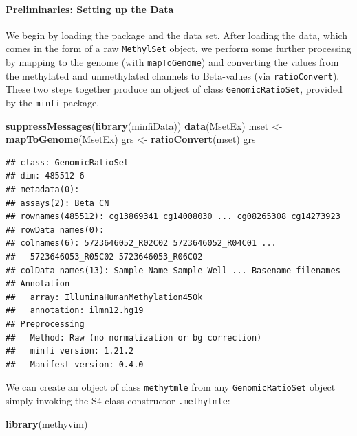 \documentclass[9pt,a4paper,]{extarticle}
\newenvironment{Shaded}{\begin{snugshade}}{\end{snugshade}}
\newcommand{\KeywordTok}[1]{\textcolor[rgb]{0.13,0.29,0.53}{\textbf{#1}}}
\newcommand{\NormalTok}[1]{#1}
\newcommand{\StringTok}[1]{\textcolor[rgb]{0.31,0.60,0.02}{#1}}
\theoremstyle{definition}
\theoremstyle{definition}
\theoremstyle{definition}
\theoremstyle{remark}
\begin{document}
\hypertarget{preliminaries-setting-up-the-data}{%
\paragraph{Preliminaries: Setting up the Data}\label{preliminaries-setting-up-the-data}}

We begin by loading the package and the data set. After loading the data, which
comes in the form of a raw \texttt{MethylSet} object, we perform some further
processing by mapping to the genome (with \texttt{mapToGenome}) and converting the
values from the methylated and unmethylated channels to Beta-values
(via \texttt{ratioConvert}). These two steps together produce an object of class
\texttt{GenomicRatioSet}, provided by the \texttt{minfi} package.

\begin{Shaded}
\begin{Highlighting}[]
\KeywordTok{suppressMessages}\NormalTok{(}\KeywordTok{library}\NormalTok{(minfiData))}
\KeywordTok{data}\NormalTok{(MsetEx)}
\NormalTok{mset <-}\StringTok{ }\KeywordTok{mapToGenome}\NormalTok{(MsetEx)}
\NormalTok{grs <-}\StringTok{ }\KeywordTok{ratioConvert}\NormalTok{(mset)}
\NormalTok{grs}
\end{Highlighting}
\end{Shaded}

\begin{verbatim}
## class: GenomicRatioSet 
## dim: 485512 6 
## metadata(0):
## assays(2): Beta CN
## rownames(485512): cg13869341 cg14008030 ... cg08265308 cg14273923
## rowData names(0):
## colnames(6): 5723646052_R02C02 5723646052_R04C01 ...
##   5723646053_R05C02 5723646053_R06C02
## colData names(13): Sample_Name Sample_Well ... Basename filenames
## Annotation
##   array: IlluminaHumanMethylation450k
##   annotation: ilmn12.hg19
## Preprocessing
##   Method: Raw (no normalization or bg correction)
##   minfi version: 1.21.2
##   Manifest version: 0.4.0
\end{verbatim}

We can create an object of class \texttt{methytmle} from any \texttt{GenomicRatioSet} object
simply invoking the S4 class constructor \texttt{.methytmle}:

\begin{Shaded}
\begin{Highlighting}[]
\KeywordTok{library}\NormalTok{(methyvim)}
\end{Highlighting}
\end{Shaded}
\end{document}
